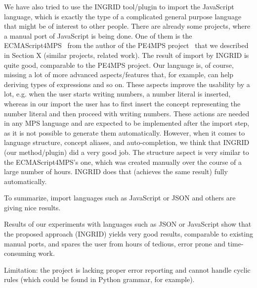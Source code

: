 We have also tried to use the INGRID tool/plugin to import the JavaScript language, which is exactly the type of a complicated general purpose language that might be of interest to other people.
There are already some projects, where a manual port of JavaScript is being done.
One of them is the ECMAScript4MPS~\cite{ref:ECMAScript4MPS} from the author of the PE4MPS project~\cite{ref:PE4MPS} that we described in Section X (similar projects, related work).
The result of import by INGRID is quite good, comparable to the PE4MPS project.
Our language is, of course, missing a lot of more advanced aspects/features that, for example, can help deriving types of expressions and so on.
These aspects improve the usability by a lot, e.g. when the user starts writing numbers, a number literal is inserted, whereas in our import the user has to first insert the concept representing the number literal and then proceed with writing numbers.
These actions are needed in any MPS language and are expected to be implemented after the import step,  as it is not possible to generate them automatically.
However, when it comes to language structure, concept aliases, and auto-completion, we think that INGRID (our method/plugin) did a very good job.
The structure aspect is very similar to the ECMAScript4MPS's one, which was created manually over the course of a large number of hours.
INGRID does that (achieves the same result) fully automatically.

To summarize, import languages such as JavaScript or JSON and others are giving nice results.

Results of our experiments with languages such as JSON or JavaScript show that the proposed approach (INGRID) yields very good results, comparable to existing manual ports, and spares the user from hours of tedious, error prone and time-consuming work.

Limitation: the project is lacking proper error reporting and cannot handle cyclic rules (which could be found in Python grammar, for example).
